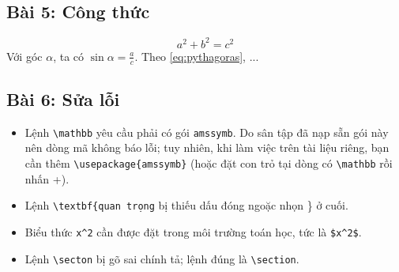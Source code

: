 \subsection*{Bài 5: Công thức}
\begin{ma}
\begin{equation}
  a^2 + b^2 = c^2
  \label{eq:pythagoras}
\end{equation}
Với góc $\alpha$, ta có $\sin\alpha = \frac{a}{c}$.
Theo \eqref{eq:pythagoras}, ...
\end{ma}

\subsection*{Bài 6: Sửa lỗi}
\begin{itemize}
  \item Lệnh \verb|\mathbb| yêu cầu phải có gói \texttt{amssymb}. Do sân tập đã
    nạp sẵn gói này nên dòng mã không báo lỗi; tuy nhiên, khi làm việc trên tài
    liệu riêng, bạn cần thêm \verb|\usepackage{amssymb}| (hoặc đặt con trỏ tại
    dòng có \verb|\mathbb| rồi nhấn +).
  \item Lệnh \verb|\textbf{quan trọng| bị thiếu dấu đóng ngoặc nhọn \} ở cuối.
  \item Biểu thức \verb|x^2| cần được đặt trong môi trường toán học, tức là
    \verb|$x^2$|.
  \item Lệnh \verb|\secton| bị gõ sai chính tả; lệnh đúng là \verb|\section|.
\end{itemize}